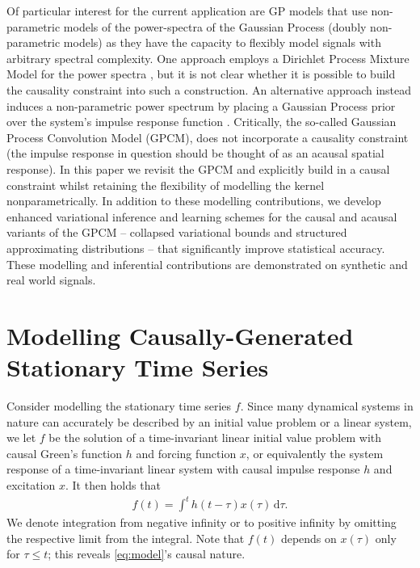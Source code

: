 \documentclass{article}
\newcommand{\id}[1]{\, \mathrm{d} #1}     %
\begin{document}
Of particular interest for the current application are GP models that use non-parametric models of the power-spectra of the Gaussian Process (doubly non-parametric models) as they have the capacity to flexibly model signals with arbitrary spectral complexity. One approach employs a Dirichlet Process Mixture Model for the power spectra \cite{Bayesian nonparametric kernel learning, Wilson}, but it is not clear whether it is possible to build the causality constraint into such a construction. An alternative approach instead induces a non-parametric power spectrum by placing a Gaussian Process prior over the system's impulse response function  \citet{Tobar:2015:Learning_Stationary}. Critically, the so-called Gaussian Process Convolution Model (GPCM), does not incorporate a causality constraint (the impulse response in question should be thought of as an acausal spatial response). In this paper we revisit the GPCM and explicitly build in a causal constraint whilst retaining the flexibility of modelling the kernel nonparametrically. In addition to these modelling contributions, we develop enhanced variational inference and learning schemes for the causal and acausal variants of the GPCM -- collapsed variational bounds and structured approximating distributions -- that significantly improve statistical accuracy. These modelling and inferential contributions are demonstrated on synthetic and real world signals.

\section{Modelling Causally-Generated Stationary Time Series}
Consider modelling the stationary time series $f$. Since many dynamical systems in nature can accurately be described by an initial value problem or a linear system, we let $f$ be the solution of a time-invariant linear initial value problem with causal Green's function $h$ and forcing function $x$, or equivalently the system response of a time-invariant linear system with causal impulse response $h$ and excitation $x$. It then holds that
\begin{align} \label{eq:model}
    f(t) = \int^t h(t- \tau)x(\tau)\id{\tau}.
\end{align}
We denote integration from negative infinity or to positive infinity by omitting the respective limit from the integral.
Note that $f(t)$ depends on $x(\tau)$ only for $\tau \le t$; this reveals \cref{eq:model}'s causal nature.
\end{document}
